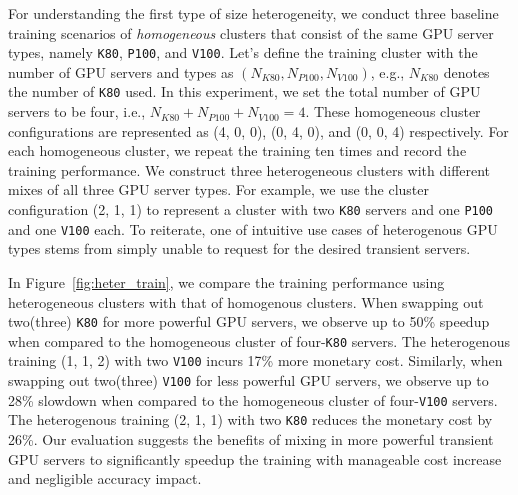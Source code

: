 For understanding the first type of size heterogeneity, we conduct three baseline training scenarios of \emph{homogeneous} clusters that
consist of the same GPU server types, namely \texttt{K80}, \texttt{P100},
and \texttt{V100}. 
%
Let's define the training cluster with the number of GPU servers and types as
$(N_{K80}, N_{P100}, N_{V100})$, e.g., $N_{K80}$ denotes the number of \texttt{K80} used.  
In this experiment, we set the total number of GPU servers to be four, i.e., $N_{K80} + N_{P100} + N_{V100} = 4$. 
%
These homogeneous cluster configurations are represented as (4, 0, 0),  (0, 4, 0), and (0, 0, 4) respectively.
For each homogeneous cluster, we repeat the training ten
times and record the training performance. We construct three heterogeneous clusters with different mixes of all three GPU server types.
For example, we use the cluster configuration (2, 1, 1) to represent a cluster with two \texttt{K80} servers and one \texttt{P100} and one
\texttt{V100} each. To reiterate, one of intuitive use cases of heterogenous GPU types stems from simply unable to request for the desired transient servers.

In Figure~\ref{fig:heter_train}, we compare the training performance using heterogeneous clusters with that of homogenous clusters. When swapping out two(three) 
 \texttt{K80} for more powerful GPU servers, we observe up to 50\% speedup when compared to the homogeneous cluster of four-\texttt{K80} servers. 
 The heterogenous training  (1, 1, 2) with two \texttt{V100} incurs 17\% more monetary cost. Similarly, when swapping out two(three) \texttt{V100} for less powerful GPU servers, 
 we observe up to 28\% slowdown when compared to the homogeneous cluster of four-\texttt{V100} servers. The heterogenous training (2, 1, 1) with two \texttt{K80}  reduces the monetary cost by 26\%. Our evaluation suggests the benefits of mixing in more powerful transient GPU servers to significantly speedup the training with manageable cost increase and negligible accuracy impact. 
 
